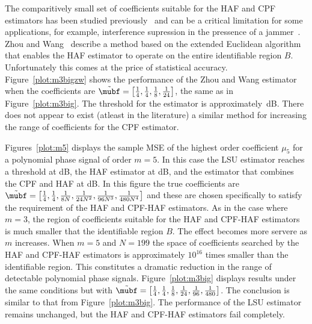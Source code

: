 \documentclass[journal]{IEEEtran}
\begin{document}
The comparitively small set of coefficients suitable for the HAF and CPF estimators has been studied previously~\cite{Angeby_PPS_aliasing_2000,Djurovic_aliasing_2012,McKilliam2009IndentifiabliltyAliasingPolyphase,Zhou_lag_diverity_PPT_1997,Xia_dynamic_range_pps_2001} and can be a critical limitation for some applications, for example, interference supression in the pressence of a jammer~\cite{Djukanovic:2011:PMN:1950994.1951252,Djurovic_aliasing_2012}.  Zhou and Wang~\cite{Zhou_lag_diverity_PPT_1997} describe a method based on the extended Euclidean algorithm that enables the HAF estimator to operate on the entire identifiable region $B$.  Unfortunately this comes at the price of statistical accuracy.  Figure~\ref{plot:m3bigzw} shows the performance of the Zhou and Wang estimator when the coefficients are $\tilde{\mubf} = \left[ \tfrac{1}{4}, \tfrac{1}{4}, \tfrac{1}{8}, \tfrac{1}{24}  \right]$, the same as in Figure~\ref{plot:m3big}.  The threshold for the estimator is approximately~\unit[29]{dB}.  There does not appear to exist (atleast in the literature) a similar method for increasing the range of coefficients for the CPF estimator.

Figures~\ref{plot:m5} displays the sample MSE of the highest order coefficient $\mu_5$  for a polynomial phase signal of order $m=5$.  In this case the LSU estimator reaches a threshold at \unit[12]{dB}, the HAF estimator at \unit[18]{dB}, and the estimator that combines the CPF and HAF at \unit[10]{dB}.  In this figure the true coefficients are $\tilde{\mubf} = \left[ \tfrac{1}{4}, \tfrac{1}{4}, \tfrac{1}{8N}, \tfrac{1}{24N^2}, \tfrac{1}{96N^3}, \tfrac{1}{480N^4}  \right]$ and these are chosen specifically to satisfy the requirement of the HAF and CPF-HAF estimators.  As in the case where $m=3$, the region of coefficients suitable for the HAF and CPF-HAF estimators is much smaller that the identifiable region $B$.  The effect becomes more servere as $m$ increases.  When $m=5$ and $N=199$ the space of coefficients searched by the HAF and CPF-HAF estimators is approximately $10^{16}$ times smaller than the identifiable region.  This constitutes a dramatic reduction in the range of detectable polynomial phase signals. Figure~\ref{plot:m3big} displays results under the same conditions but with $\tilde{\mubf} = \left[ \tfrac{1}{4}, \tfrac{1}{4}, \tfrac{1}{8}, \tfrac{1}{24}, \tfrac{1}{96}, \tfrac{1}{480}  \right]$.  The conclusion is similar to that from Figure~\ref{plot:m3big}.  The performance of the LSU estimator remains unchanged, but the HAF and CPF-HAF estimators fail completely.
\end{document}
